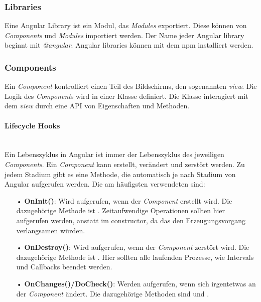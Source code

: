 \subsubsection{Libraries}
\label{sec:ang-libraries}
Eine Angular Library ist ein Modul, das \textit{Modules} exportiert. Diese können von \textit{Components} und \textit{Modules} importiert werden. Der Name jeder Angular library beginnt mit \textit{@angular}. Angular libraries können mit dem \ac{npm} installiert werden.

\subsubsection{Components}
\label{sec:ang-components}
Ein \textit{Component} kontrolliert einen Teil des Bildschirms, den sogenannten \textit{view}. Die Logik des \textit{Component}s wird in einer Klasse definiert. Die Klasse interagiert mit dem \textit{view} durch eine \ac{API} von Eigenschaften und Methoden.

\paragraph*{Lifecycle Hooks}\mbox{}\\
Ein Lebenszyklus in Angular ist immer der Lebenszyklus des jeweiligen \textit{Components}. Ein \textit{Component} kann erstellt, verändert und zerstört werden. Zu jedem Stadium gibt es eine Methode, die automatisch je nach Stadium von Angular aufgerufen werden. Die am häufigsten verwendeten sind:

\begin{itemize}
\item[•] \textbf{OnInit()}: Wird aufgerufen, wenn der \textit{Component} erstellt wird. Die dazugehörige Methode ist . Zeitaufwendige Operationen sollten hier aufgerufen werden, anstatt im constructor, da das den Erzeugungsvorgang verlangsamen würden.
\item[•] \textbf{OnDestroy()}: Wird aufgerufen, wenn der \textit{Component} zerstört wird. Die dazugehörige Methode ist . Hier sollten alle laufenden Prozesse, wie Intervals und Callbacks beendet werden.
\item[•] \textbf{OnChanges()/DoCheck()}: Werden aufgerufen, wenn sich irgentetwas an der \textit{Component} ändert. Die dazugehörige Methoden sind  und .
\end{itemize}

